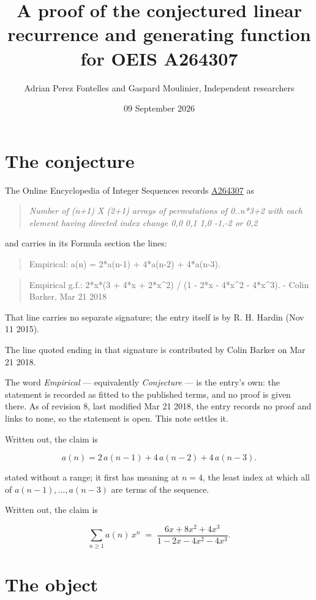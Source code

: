 \documentclass[11pt]{article}
\title{A proof of the conjectured linear recurrence and generating function for OEIS A264307}
\author{Adrian Perez Fontelles and Gaspard Moulinier, Independent researchers}
\date{09 September 2026}
\theoremstyle{definition}
\begin{document}
\maketitle
\section{The conjecture}

The Online Encyclopedia of Integer Sequences records \href{https://oeis.org/A264307}{A264307} as

\begin{quote}\itshape Number of (n+1) X (2+1) arrays of permutations of 0..n*3+2 with each element having directed index change 0,0 0,1 1,0 -1,-2 or 0,2\end{quote}

and carries in its Formula section the lines:

\begin{quote}\ttfamily Empirical: a(n) = 2*a(n-1) + 4*a(n-2) + 4*a(n-3).\end{quote}

\begin{quote}\ttfamily Empirical g.f.: 2*x*(3 + 4*x + 2*x\textasciicircum{}2) / (1 - 2*x - 4*x\textasciicircum{}2 - 4*x\textasciicircum{}3). - Colin Barker, Mar 21 2018\end{quote}

That line carries no separate signature; the entry itself is by R. H. Hardin (Nov 11 2015).

The line quoted ending in that signature is contributed by Colin Barker on Mar 21 2018.

The word {\itshape Empirical} --- equivalently {\itshape Conjecture} --- is the entry's own: the statement is recorded as fitted to the published terms, and no proof is given there. As of revision 8, last modified Mar 21 2018, the entry records no proof and links to none, so the statement is open. This note settles it.

Written out, the claim is

\[a(n) = 2\,a(n-1) + 4\,a(n-2) + 4\,a(n-3).\]

stated without a range; it first has meaning at $n = 4$, the least index at which all of $a(n-1),\dots,a(n-3)$ are terms of the sequence.

Written out, the claim is

\[\sum_{n \ge 1} a(n)\,x^n \;=\; \frac{6x + 8x^{2} + 4x^{3}}{1 - 2x - 4x^{2} - 4x^{3}}.\]

\section{The object}
\end{document}
